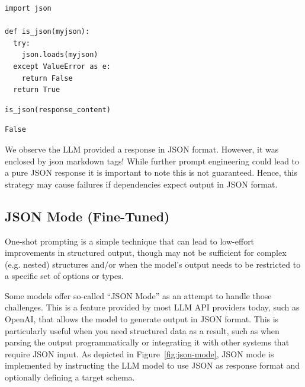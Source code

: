 \begin{verbatim}
import json

def is_json(myjson):
  try:
    json.loads(myjson)
  except ValueError as e:
    return False
  return True
\end{verbatim}

\begin{verbatim}
is_json(response_content)
\end{verbatim}

\begin{verbatim}
False
\end{verbatim}



We observe the LLM provided a response in JSON format. However, it was enclosed by json markdown tags! While further prompt engineering could lead to a pure JSON response it is important to note this is not guaranteed. Hence, this strategy may cause failures if dependencies expect output in JSON format.
\subsection{JSON Mode (Fine-Tuned)}

One-shot prompting is a simple technique that can lead to low-effort improvements in structured output, though may not be sufficient for complex (e.g. nested) structures and/or when the model's output needs to be restricted to a specific set of options or types.

Some models offer so-called ``JSON Mode'' as an attempt to handle those challenges. This is a feature provided by most LLM API providers today, such as OpenAI, that allows the model to generate output in JSON format. This is particularly useful when you need structured data as a result, such as when parsing the output programmatically or integrating it with other systems that require JSON input. As depicted in Figure~\ref{fig:json-mode}, JSON mode is implemented by instructing the LLM model to use JSON as response format and optionally defining a target schema.

